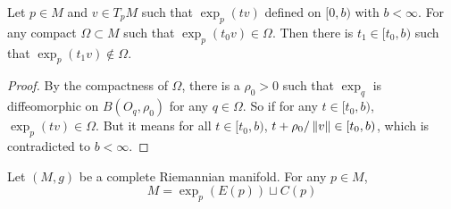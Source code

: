 \begin{lem}
	Let $p \in M$ and $v \in T_pM$ such that $\exp_p(tv)$ defined on $[0,b)$ with $b < \infty$. For any compact $\Omega \subset M$ such that $\exp_p(t_0v) \in \Omega$. Then there is $t_1 \in [t_0,b)$ such that $\exp_p(t_1v) \notin \Omega$.
\end{lem}
\begin{proof}
	By the compactness of $\Omega$, there is a $\rho_0 > 0$ such that $\exp_q$ is diffeomorphic on $B(O_q,\rho_0)$ for any $q \in \Omega$. So if for any $t \in [t_0,b)$, $\exp_p(tv) \in \Omega$. But it means for all $t \in [t_0,b)$, $t + \rho_0 / \left\lVert v\right\lVert \in [t_0,b)$, which is contradicted to $b < \infty$.
\end{proof}
\begin{cor}
	Let $(M,g)$ be a complete Riemannian manifold. For any $p \in M$,
	\begin{equation*}
		M = \exp_p(E(p))\sqcup C(p)
	\end{equation*}
\end{cor}

